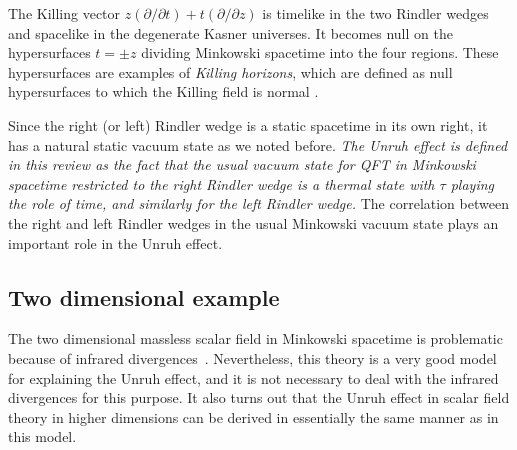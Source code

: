 \documentclass[12pt,nofootinbib,floatfix,aps,prd,showpacs,amsmath,amssymb,eqsecnum]{revtex4-2}
\let\cite\citep
\begin{document}
The Killing vector $z(\partial/\partial t) + t(\partial/\partial z)$ is
timelike in the two Rindler wedges and spacelike in the
degenerate Kasner universes.  It becomes null on 
the hypersurfaces 
$t=\pm z$ dividing Minkowski spacetime into the four regions. 
These hypersurfaces are examples of {\em Killing horizons}, 
which are defined as null hypersurfaces to which the Killing
field is normal \cite{WaldQFTCS}.

Since the right (or left) Rindler wedge
is a static spacetime in its own right, it has a
natural static vacuum state as we noted before.
{\em The Unruh effect is defined in this review as the fact that
the usual vacuum state for QFT in Minkowski spacetime
restricted to the right Rindler wedge is a thermal state 
with $\tau$ playing 
the role of time, and similarly for the left Rindler wedge.}  
The correlation between the right
and left Rindler wedges in the usual Minkowski vacuum state plays an
important role in the Unruh effect.

\subsection{Two dimensional example}
\label{twodimensions}

The two dimensional massless scalar field in Minkowski spacetime is
problematic because of infrared divergences~\cite{Coleman73}. 
Nevertheless, this theory
is a very good model for explaining the Unruh effect,
and it is not necessary to deal with the infrared divergences for this
purpose.  It also turns out that the Unruh effect in scalar
field theory in higher dimensions can be derived in essentially the same
manner as in this model.
\end{document}
